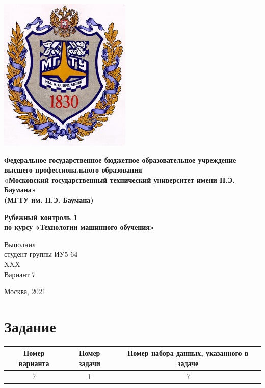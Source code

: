 \documentclass[a4paper]{article}
\begin{document}
  \fontsize{14}{16}\selectfont

  \begin{titlepage}
    \begin{minipage}{0.2\textwidth}
      \includegraphics[scale=0.4]{logo}
    \end{minipage}
    \begin{minipage}{0.7\textwidth}\centering
      \fontsize{10}{12}\selectfont
      \textbf{
        Федеральное государственное бюджетное образовательное учреждение \\
        высшего профессионального образования \\
        «Московский государственный технический университет имени Н.Э. Баумана» \\
        (МГТУ им. Н.Э. Баумана)
      }
    \end{minipage}

    \vspace{5cm}
    \centering
    \textbf{
      Рубежный контроль 1 \\
      по курсу «Технологии машинного обучения» \\
    }

    \vspace{5cm}
    \begin{flushright}
    Выполнил \\
    студент группы ИУ5-64 \\
    XXX \\
    Вариант 7
    \end{flushright}
    \vspace*{\fill}
    Москва, 2021
  \end{titlepage}

  \section*{Задание}
  \begin{center}
    \begin{tabular}{|c|c|c|}
      \hline
      Номер варианта & Номер задачи & Номер набора данных, указанного в задаче \\
      \hline
      7 & 1 & 7 \\
      \hline
    \end{tabular}
  \end{center}
\end{document}
